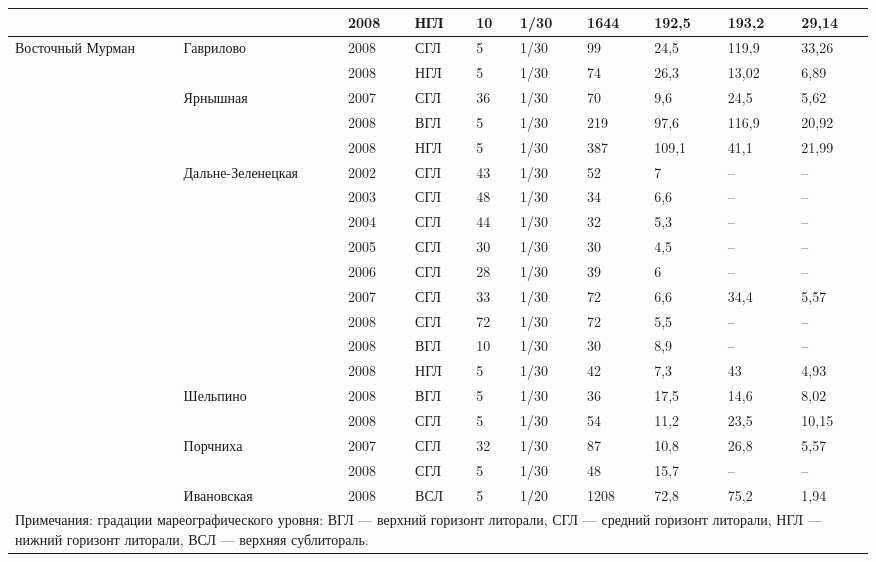 \begin{footnotesize}
\begin{center}
\begin{longtable}{|p{1.6cm}|p{2.3cm}|p{1cm}|p{1.6cm}|p{1.1cm}|p{1.1cm}|*{4}{p{1cm}|}}
                 &                   & 2008       & НГЛ & 10 & 1/30 & 1644 & 192,5 & 193,2 & 29,14 \\ \hline
Восточный Мурман & Гаврилово         & 2008       & СГЛ & 5  & 1/30 & 99   & 24,5  & 119,9 & 33,26 \\
                 &                   & 2008       & НГЛ & 5  & 1/30 & 74   & 26,3  & 13,02 & 6,89  \\ \cline{2-10}
                 & Ярнышная          & 2007       & СГЛ & 36 & 1/30 & 70   & 9,6   & 24,5  & 5,62  \\
                 &                   & 2008       & ВГЛ & 5  & 1/30 & 219  & 97,6  & 116,9 & 20,92 \\
                 &                   & 2008       & НГЛ & 5  & 1/30 & 387  & 109,1 & 41,1  & 21,99 \\ \cline{2-10}
                 & Даль\-не-Зе\-ле\-нец\-кая  & 2002       & СГЛ & 43 & 1/30 & 52   & 7     & --    & --    \\
                 &                   & 2003       & СГЛ & 48 & 1/30 & 34   & 6,6   & --    & --    \\
                 &                   & 2004       & СГЛ & 44 & 1/30 & 32   & 5,3   & --    & --    \\
                 &                   & 2005       & СГЛ & 30 & 1/30 & 30   & 4,5   & --    & --    \\
                 &                   & 2006       & СГЛ & 28 & 1/30 & 39   & 6     & --    & --    \\
                 &                   & 2007       & СГЛ & 33 & 1/30 & 72   & 6,6   & 34,4  & 5,57  \\
                 &                   & 2008       & СГЛ & 72 & 1/30 & 72   & 5,5   & --    & --    \\
                 &                   & 2008       & ВГЛ & 10 & 1/30 & 30   & 8,9   & --    & --    \\
                 &                   & 2008       & НГЛ & 5  & 1/30 & 42   & 7,3   & 43    & 4,93  \\ \cline{2-10}
                 & Шельпино          & 2008       & ВГЛ & 5  & 1/30 & 36   & 17,5  & 14,6  & 8,02  \\
                 &                   & 2008       & СГЛ & 5  & 1/30 & 54   & 11,2  & 23,5  & 10,15 \\ \cline{2-10}
                 & Порчниха          & 2007       & СГЛ & 32 & 1/30 & 87   & 10,8  & 26,8  & 5,57  \\
                 &                   & 2008       & СГЛ & 5  & 1/30 & 48   & 15,7  & --    & --    \\ \cline{2-10}
                 & Ивановская        & 2008       & ВСЛ & 5  & 1/20 & 1208 & 72,8  & 75,2  & 1,94  \\ \hline
	\multicolumn{10}{p{16cm}}{Примечания: градации мареографического уровня: ВГЛ --- верхний горизонт литорали, СГЛ --- средний горизонт литорали, НГЛ --- нижний горизонт литорали, ВСЛ --- верхняя сублитораль. 

}
\end{longtable}
\end{center}
\end{footnotesize}
